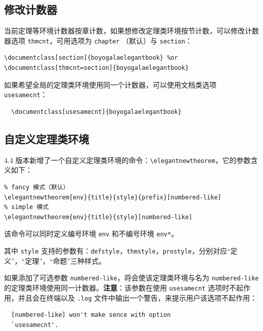 \documentclass[lang=cn,10pt,scheme=chinese]{boyogalaelegantbook}
\begin{document}
\subsection{修改计数器}

当前定理等环境计数器按章计数，如果想修改定理类环境按节计数，可以修改计数器选项 \lstinline{thmcnt}，可用选项为 \lstinline{chapter} （默认）与 \lstinline{section}：

\begin{lstlisting}
\documentclass[section]{boyogalaelegantbook} %or
\documentclass[thmcnt=section]{boyogalaelegantbook}
\end{lstlisting}

如果希望全局的定理类环境使用同一个计数器，可以使用文档类选项 \lstinline{usesamecnt}：

\begin{lstlisting}
  \documentclass[usesamecnt]{boyogalaelegantbook}
\end{lstlisting}

\subsection{自定义定理类环境}

4.4 版本新增了一个自定义定理类环境的命令：\lstinline|\elegantnewtheorem|，它的参数含义如下：

\begin{lstlisting}
% fancy 模式（默认）
\elegantnewtheorem{env}{title}{style}{prefix}[numbered-like]
% simple 模式
\elegantnewtheorem{env}{title}{style}[numbered-like]
\end{lstlisting}
该命令可以同时定义编号环境 \lstinline|env| 和不编号环境 \lstinline|env*|。

其中 \lstinline|style| 支持的参数有：\lstinline|defstyle|，\lstinline|thmstyle|，\lstinline|prostyle|，分别对应“定义”，“定理”，“命题”三种样式。

如果添加了可选参数 \lstinline{numbered-like}，将会使该定理类环境与名为 \lstinline{numbered-like} 的定理类环境使用同一计数器。\textbf{注意}：该参数在使用 \lstinline{usesamecnt} 选项时不起作用，并且会在终端以及 \lstinline{.log} 文件中输出一个警告，来提示用户该选项不起作用：

\begin{lstlisting}
  [numbered-like] won't make sence with option
  `usesamecnt'.
\end{lstlisting}
\end{document}
